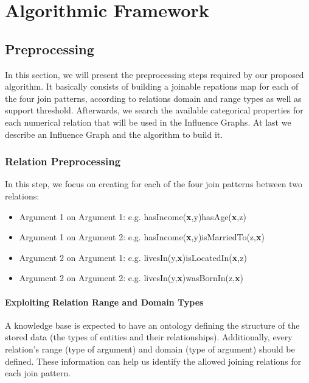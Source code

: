 \chapter{Algorithmic Framework}
\label{ch:intro}

\section{Preprocessing}

In this section, we will present the preprocessing steps required by our proposed algorithm. It basically consists of building a joinable repations map for each of the four join patterns, according to relations domain and range types as well as support threshold. Afterwards, we search the available categorical properties for each numerical relation that will be used in the Influence Graphs. At last we describe an Influence Graph and the algorithm to build it.

\subsection{Relation Preprocessing}

In this step, we focus on creating for each of the four join patterns between two relations:

\begin{itemize}
 \item Argument 1 on Argument 1: e.g. hasIncome(\textbf{x},y)hasAge(\textbf{x},z)
 \item Argument 1 on Argument 2: e.g. hasIncome(\textbf{x},y)isMarriedTo(z,\textbf{x})
 \item Argument 2 on Argument 1: e.g. livesIn(y,\textbf{x})isLocatedIn(\textbf{x},z)
 \item Argument 2 on Argument 2: e.g. livesIn(y,\textbf{x})wasBornIn(z,\textbf{x})
\end{itemize}



\subsubsection{Exploiting Relation Range and Domain Types}

A knowledge base is expected to have an ontology defining the structure of the stored data (the types of entities and their relationships). Additionally, every relation's range (type of  argument) and domain (type of  argument) should be defined. These information can help us identify the allowed joining relations for each join pattern.

